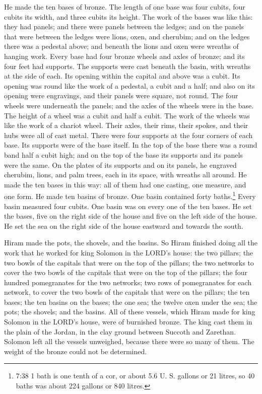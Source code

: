  He made the ten bases of bronze. The length of one base
was four cubits, four cubits its width, and three cubits its height.
 The work of the bases was like this: they had panels; and
there were panels between the ledges;  and on the panels
that were between the ledges were lions, oxen, and cherubim; and on the
ledges there was a pedestal above; and beneath the lions and oxen were
wreaths of hanging work.  Every base had four bronze wheels
and axles of bronze; and its four feet had supports. The supports were
cast beneath the basin, with wreaths at the side of each. 
Its opening within the capital and above was a cubit. Its opening was
round like the work of a pedestal, a cubit and a half; and also on its
opening were engravings, and their panels were square, not round.
 The four wheels were underneath the panels; and the axles
of the wheels were in the base. The height of a wheel was a cubit and
half a cubit.  The work of the wheels was like the work of
a chariot wheel. Their axles, their rims, their spokes, and their hubs
were all of cast metal.  There were four supports at the
four corners of each base. Its supports were of the base itself.
 In the top of the base there was a round band half a cubit
high; and on the top of the base its supports and its panels were the
same.  On the plates of its supports and on its panels, he
engraved cherubim, lions, and palm trees, each in its space, with
wreaths all around.  He made the ten bases in this way: all
of them had one casting, one measure, and one form.  He
made ten basins of bronze. One basin contained forty baths.\footnote{7:38
  1 bath is one tenth of a cor, or about 5.6 U. S. gallons or 21 litres,
  so 40 baths was about 224 gallons or 840 litres.} Every basin measured
four cubits. One basin was on every one of the ten bases. 
He set the bases, five on the right side of the house and five on the
left side of the house. He set the sea on the right side of the house
eastward and towards the south.

 Hiram made the pots, the shovels, and the basins. So Hiram
finished doing all the work that he worked for king Solomon in the
LORD's house:  the two pillars; the two bowls of the
capitals that were on the top of the pillars; the two networks to cover
the two bowls of the capitals that were on the top of the pillars;
 the four hundred pomegranates for the two networks; two
rows of pomegranates for each network, to cover the two bowls of the
capitals that were on the pillars;  the ten bases; the ten
basins on the bases;  the one sea; the twelve oxen under
the sea;  the pots; the shovels; and the basins. All of
these vessels, which Hiram made for king Solomon in the LORD's house,
were of burnished bronze.  The king cast them in the plain
of the Jordan, in the clay ground between Succoth and Zarethan.
 Solomon left all the vessels unweighed, because there were
so many of them. The weight of the bronze could not be determined.


